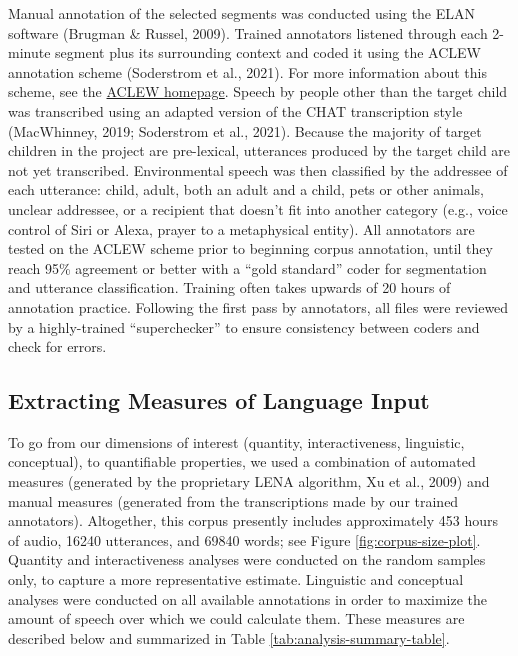 \documentclass[
  man]{apa6}
\begin{document}
Manual annotation of the selected segments was conducted using the ELAN software (Brugman \& Russel, 2009). Trained annotators listened through each 2-minute segment plus its surrounding context and coded it using the ACLEW annotation scheme (Soderstrom et al., 2021). For more information about this scheme, see the \href{https://sites.google.com/view/aclewdid/home}{ACLEW homepage}. Speech by people other than the target child was transcribed using an adapted version of the CHAT transcription style (MacWhinney, 2019; Soderstrom et al., 2021). Because the majority of target children in the project are pre-lexical, utterances produced by the target child are not yet transcribed. Environmental speech was then classified by the addressee of each utterance: child, adult, both an adult and a child, pets or other animals, unclear addressee, or a recipient that doesn't fit into another category (e.g., voice control of Siri or Alexa, prayer to a metaphysical entity). All annotators are tested on the ACLEW scheme prior to beginning corpus annotation, until they reach 95\% agreement or better with a ``gold standard'' coder for segmentation and utterance classification. Training often takes upwards of 20 hours of annotation practice. Following the first pass by annotators, all files were reviewed by a highly-trained ``superchecker'' to ensure consistency between coders and check for errors.

\hypertarget{extracting-measures-of-language-input}{%
\subsection{Extracting Measures of Language Input}\label{extracting-measures-of-language-input}}

To go from our dimensions of interest (quantity, interactiveness, linguistic, conceptual), to quantifiable properties, we used a combination of automated measures (generated by the proprietary LENA algorithm, Xu et al., 2009) and manual measures (generated from the transcriptions made by our trained annotators). Altogether, this corpus presently includes approximately 453 hours of audio, 16240 utterances, and 69840 words; see Figure \ref{fig:corpus-size-plot}. Quantity and interactiveness analyses were conducted on the random samples only, to capture a more representative estimate. Linguistic and conceptual analyses were conducted on all available annotations in order to maximize the amount of speech over which we could calculate them. These measures are described below and summarized in Table \ref{tab:analysis-summary-table}.
\end{document}
